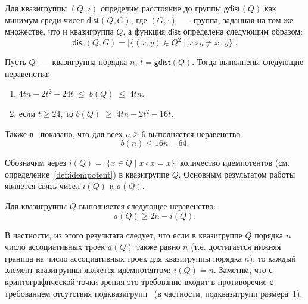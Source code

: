     \begin{definition}
        Для квазигруппы $(Q, \circ)$ определим расстояние до группы $\mathsf{gdist}(Q)$ как минимум среди чисел $\mathsf{dist}(Q, G)$, где $(G, \cdot)$~---~группа, заданная на том же множестве, что и квазигруппа $Q$, а функция $\mathsf{dist}$ определена следующим образом:
        \[
            \mathsf{dist}(Q, G) = \lvert \{(x, y) \in Q^2 \mid x \circ y \ne x \cdot y\} \rvert.
        \] 
    \end{definition}

    \begin{proposition}
        Пусть $Q$~---~квазигруппа порядка $n$, $t = \mathsf{gdist}(Q)$.
        Тогда выполнены следующие неравенства:
        \begin{enumerate}
            \item $4tn - 2t^2 - 24t \; \le \; b(Q) \; \le \; 4tn$.
            \item если $t \ge 24$, то $b(Q) \; \ge \; 4tn - 2t^2 - 16t$.
        \end{enumerate}
    \end{proposition}
    Также в~\cite{drapal1983quasigroups} показано, что для всех $n \ge 6$ выполняется неравенство
    \[
        b(n) \le 16n - 64.
    \]

    Обозначим через $i(Q) = \lvert \{x \in Q \mid x \circ x = x\} \rvert$ количество идемпотентов (см. определение~\ref{def:idempotent}) в квазигруппе $Q$. 
    Основным результатом работы~\cite{groek11} является связь чисел $i(Q)$ и $a(Q)$.
    \begin{proposition}
    \label{proposition:idempotent}
        Для квазигруппы $Q$ выполняется следующее неравенство:
        \[
            a(Q) \ge 2n - i(Q).
        \]
    \end{proposition}
    В частности, из этого результата следует, что если в квазигруппе $Q$ порядка $n$ число ассоциативных троек $a(Q)$ также равно $n$ (т.е. достигается нижняя граница на число ассоциативных троек для квазигруппы порядка $n$), то каждый элемент квазигруппы является идемпотентом: $i(Q)=n$.
    Заметим, что с криптографической точки зрения это требование входит в противоречие с требованием отсутствия подквазигрупп~\cite{EdonR, artamonov18} (в частности, подквазигрупп размера~1).


